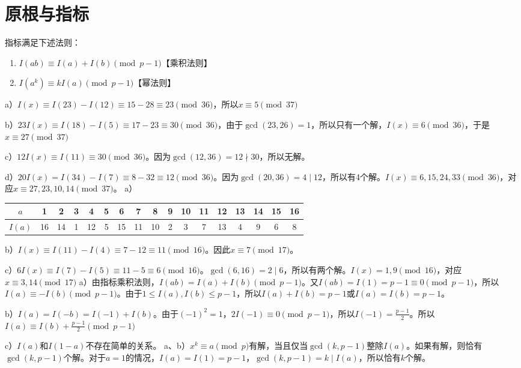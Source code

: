 \chapter{原根与指标}
\begin{theorem}[指标法则]
指标满足下述法则：
\begin{enumerate}
\item $I(ab)\equiv I(a) + I(b)\pmod{p-1}$【乘积法则】
\item $I(a^k)\equiv kI(a)\pmod{p-1}$【幂法则】
\end{enumerate}
\end{theorem}
%
\exercise a）$I(x)\equiv I(23)-I(12)\equiv15-28\equiv23\pmod{36}$，所以$x\equiv5\pmod{37}$\par
b）$23I(x)\equiv I(18)-I(5)\equiv 17-23\equiv30\pmod{36}$，由于$\gcd(23, 26)=1$，所以只有一个解，$I(x)\equiv6\pmod{36}$，于是$x\equiv27\pmod{37}$\par
c）$12I(x)\equiv I(11)\equiv30\pmod{36}$。因为$\gcd(12,36)=12\nmid 30$，所以无解。\par
d）$20I(x)=I(34)-I(7)\equiv8-32\equiv12\pmod{36}$。因为$\gcd(20,36)=4\mid 12$，所以有4个解。$I(x)\equiv6,15,24,33\pmod{36}$，对应$x\equiv27,23,10,14\pmod{37}$。
%
\exercise a）
\begin{center}
\begin{tabular}{c|*{16}{c}}
$a$ & 1 & 2 & 3 & 4 & 5 & 6 & 7 & 8 & 9 & 10 & 11 & 12 & 13 & 14 & 15 & 16 \\
\hline
$I(a)$ & 16 & 14 & 1 & 12 & 5 & 15 & 11 & 10 & 2 & 3 & 7 & 13 & 4 & 9 & 6 & 8 \\
\end{tabular}
\end{center}
b）$I(x)\equiv I(11)-I(4)\equiv7-12\equiv11\pmod{16}$。因此$x\equiv7\pmod{17}$。\par
c）$6I(x)\equiv I(7)-I(5)\equiv11-5\equiv6\pmod{16}$。$\gcd(6,16)=2\mid 6$，所以有两个解。$I(x)=1,9\pmod{16}$，对应$x\equiv3,14\pmod{17}$
% 
\exercise a）由指标乘积法则，$I(ab)=I(a)+I(b)\pmod{p-1}$。又$I(ab)=I(1)=p-1\equiv0\pmod{p-1}$，所以$I(a)\equiv-I(b)\pmod{p-1}$。由于$1\le I(a),I(b)\le p-1$，所以$I(a)+I(b)=p-1$或$I(a)=I(b)=p-1$。\par
b）$I(a)=I(-b)=I(-1)+I(b)$。由于$(-1)^2=1$，$2I(-1)\equiv0\pmod{p-1}$，所以$I(-1)=\frac{p-1}{2}$。所以$I(a)\equiv I(b)+\frac{p-1}{2}\pmod{p-1}$\par
c）$I(a)$和$I(1-a)$不存在简单的关系。
%
\exercise a、b）$x^k\equiv a\pmod p$有解，当且仅当$\gcd(k,p-1)$整除$I(a)$。如果有解，则恰有$\gcd(k,p-1)$个解。对于$a=1$的情况，$I(a)=I(1)=p-1$，$\gcd(k, p-1)=k\mid I(a)$，所以恰有$k$个解。\par
